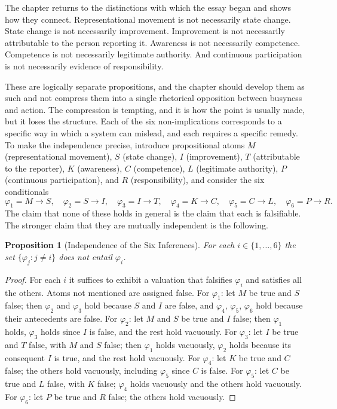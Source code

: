 \documentclass[11pt]{report}
\newtheorem{proposition}[theorem]{Proposition}
\theoremstyle{definition}
\theoremstyle{remark}
\begin{document}
The chapter returns to the distinctions with which the essay began and shows how they connect. Representational movement is not necessarily state change. State change is not necessarily improvement. Improvement is not necessarily attributable to the person reporting it. Awareness is not necessarily competence. Competence is not necessarily legitimate authority. And continuous participation is not necessarily evidence of responsibility.

These are logically separate propositions, and the chapter should develop them as such and not compress them into a single rhetorical opposition between busyness and action. The compression is tempting, and it is how the point is usually made, but it loses the structure. Each of the six non-implications corresponds to a specific way in which a system can mislead, and each requires a specific remedy. To make the independence precise, introduce propositional atoms $M$ (representational movement), $S$ (state change), $I$ (improvement), $T$ (attributable to the reporter), $K$ (awareness), $C$ (competence), $L$ (legitimate authority), $P$ (continuous participation), and $R$ (responsibility), and consider the six conditionals
\[
\varphi_1=M\to S,\quad \varphi_2=S\to I,\quad \varphi_3=I\to T,\quad \varphi_4=K\to C,\quad \varphi_5=C\to L,\quad \varphi_6=P\to R .
\]
The claim that none of these holds in general is the claim that each is falsifiable. The stronger claim that they are mutually independent is the following.

\begin{proposition}[Independence of the Six Inferences]\label{prop:indep}
For each $i\in\{1,\dots,6\}$ the set $\{\varphi_j:j\ne i\}$ does not entail $\varphi_i$.
\end{proposition}

\begin{proof}
For each $i$ it suffices to exhibit a valuation that falsifies $\varphi_i$ and satisfies all the others. Atoms not mentioned are assigned false. For $\varphi_1$: let $M$ be true and $S$ false; then $\varphi_2$ and $\varphi_3$ hold because $S$ and $I$ are false, and $\varphi_4$, $\varphi_5$, $\varphi_6$ hold because their antecedents are false. For $\varphi_2$: let $M$ and $S$ be true and $I$ false; then $\varphi_1$ holds, $\varphi_3$ holds since $I$ is false, and the rest hold vacuously. For $\varphi_3$: let $I$ be true and $T$ false, with $M$ and $S$ false; then $\varphi_1$ holds vacuously, $\varphi_2$ holds because its consequent $I$ is true, and the rest hold vacuously. For $\varphi_4$: let $K$ be true and $C$ false; the others hold vacuously, including $\varphi_5$ since $C$ is false. For $\varphi_5$: let $C$ be true and $L$ false, with $K$ false; $\varphi_4$ holds vacuously and the others hold vacuously. For $\varphi_6$: let $P$ be true and $R$ false; the others hold vacuously.
\end{proof}
\end{document}
